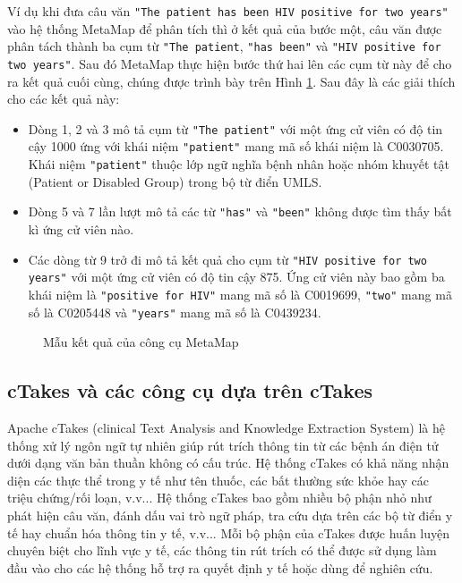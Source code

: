 Ví dụ khi đưa câu văn \texttt{"The patient has been HIV positive for two years"} vào hệ thống MetaMap để phân tích thì ở kết quả của bước một, câu văn được phân tách thành ba cụm từ \texttt{"The patient}, \texttt{"has been"} và \texttt{"HIV positive for two years"}. Sau đó MetaMap thực hiện bước thứ hai lên các cụm từ này để cho ra kết quả cuối cùng, chúng được trình bày trên Hình \ref{metamapoutput}. Sau đây là các giải thích cho các kết quả này:

\begin{itemize}
\item Dòng 1, 2 và 3 mô tả cụm từ \texttt{"The patient"} với một ứng cử viên có độ tin cậy 1000 ứng với khái niệm \texttt{"patient"} mang mã số khái niệm là C0030705. Khái niệm \texttt{"patient"} thuộc lớp ngữ nghĩa bệnh nhân hoặc nhóm khuyết tật (Patient or Disabled Group) trong bộ từ điển UMLS.
\item Dòng 5 và 7 lần lượt mô tả các từ \texttt{"has"} và \texttt{"been"} không được tìm thấy bất kì ứng cử viên nào.
\item Các dòng từ 9 trở đi mô tả kết quả cho cụm từ \texttt{"HIV positive for two years"} với một ứng cử viên có độ tin cậy 875. Ứng cử viên này bao gồm ba khái niệm là \texttt{"positive for HIV"} mang mã số là C0019699, \texttt{"two"} mang mã số là C0205448 và \texttt{"years"} mang mã số là C0439234. 
\end{itemize}

\begin{figure}[ht]
\centering
{}

\caption{Mẫu kết quả của công cụ MetaMap\label{metamapoutput}}
\end{figure}

\subsection*{cTakes và các công cụ dựa trên cTakes}
Apache cTakes (clinical Text Analysis and Knowledge Extraction System) là hệ thống xử lý ngôn ngữ tự nhiên giúp rút trích thông tin từ các bệnh án điện tử dưới dạng văn bản thuần không có cấu trúc. Hệ thống cTakes có khả năng nhận diện các thực thể trong y tế như tên thuốc, các bất thường sức khỏe hay các triệu chứng/rối loạn, v.v... Hệ thống cTakes bao gồm nhiều bộ phận nhỏ như phát hiện câu văn, đánh dấu vai trò ngữ pháp, tra cứu dựa trên các bộ từ điển y tế hay chuẩn hóa thông tin y tế, v.v... Mỗi bộ phận của cTakes được huấn luyện chuyên biệt cho lĩnh vực y tế, các thông tin rút trích có thể được sử dụng làm đầu vào cho các hệ thống hỗ trợ ra quyết định y tế hoặc dùng để nghiên cứu.


